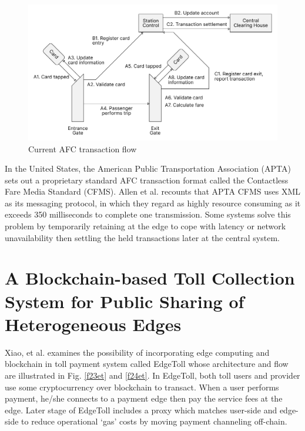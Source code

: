 \documentclass[a4paper,12pt,oneside, utf8x]{report}
\begin{document}
    \begin{figure}[H]
        \centering
        \includegraphics[width=.96\textwidth]{figures/tafc2.pdf}
        \caption{Current AFC transaction flow}
        \label{f22currentaafc}
    \end{figure}
    
In the United States, the American Public Transportation Association (APTA) sets out a proprietary standard AFC transaction format called the Contactless Fare Media Standard (CFMS). Allen et al. \cite{a17} recounts that APTA CFMS uses XML as its messaging protocol, in which they regard as highly resource consuming as it exceeds 350 milliseconds to complete one transmission. Some systems solve this problem by temporarily retaining at the edge to cope with latency or network unavailability \cite{a4} then settling the held transactions later at the central system.

\section{A Blockchain-based Toll Collection System for Public Sharing of Heterogeneous Edges \cite{a18}}

Xiao, et al. \cite{a18} examines the possibility of incorporating edge computing and blockchain in toll payment system called EdgeToll whose architecture and flow are illustrated in Fig. \ref{f23et} and \ref{f24et}. In EdgeToll, both toll users and provider use some cryptocurrency over blockchain to transact. When a user performs payment, he/she connects to a payment edge then pay the service fees at the edge. Later stage of EdgeToll includes a proxy which matches user-side and edge-side to reduce operational ‘gas’ costs by moving payment channeling off-chain.
\end{document}
